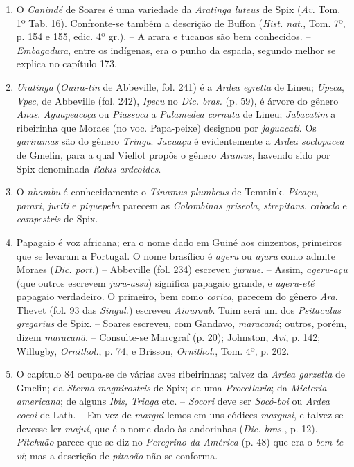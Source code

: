 \begin{enumerate}
\item O \textit{Canindé} de Soares é uma variedade da \textit{Aratinga luteus} de Spix (\textit{Av.} Tom. 1º 
Tab. 16). Confronte-se também a descrição de Buffon (\textit{Hist. nat.}, Tom. 7º, p. 154 e 155, edic. 4º gr.). 
-- A arara e tucanos são bem conhecidos. -- \textit{Embagadura}, entre os 
indígenas, era o punho da espada, segundo melhor se explica no capítulo 173.

\item \textit{Uratinga} (\textit{Ouira-tin} de Abbeville, fol. 241) é a \textit{Ardea egretta} de Lineu; 
\textit{Upeca}, \textit{Vpec}, de Abbeville (fol. 242), \textit{Ipecu} no \textit{Dic. bras.} (p. 59), é árvore do gênero \textit{Anas}.
\textit{Aguapeacoça} ou \textit{Piassoca} a \textit{Palamedea cornuta} de Lineu; 
\textit{Jabacatim} a ribeirinha que Moraes (no voc. Papa-peixe) designou por \textit{jaguacati}. Os 
\textit{gariramas} são do gênero \textit{Tringa}. \textit{Jacuaçu} é evidentemente a \textit{Ardea soclopacea} de Gmelin, 
para a qual Viellot propôs o gênero \textit{Aramus}, havendo sido por Spix denominada \textit{Ralus ardeoides}.

\item O \textit{nhambu} é conhecidamente o \textit{Tinamus plumbeus} de Temnink. \textit{Picaçu}, \textit{parari}, 
\textit{juriti} e \textit{piquepeba} parecem as \textit{Colombinas griseola},
\textit{strepitans}, \textit{caboclo} e \textit{campestris} de Spix.

\item Papagaio é voz africana; era o nome dado em Guiné aos cinzentos, primeiros que 
se levaram a Portugal. O nome brasílico é \textit{ageru} ou \textit{ajuru} como admite Moraes (\textit{Dic. 
port.}) -- Abbeville (fol. 234) escreveu \textit{juruue}. -- Assim, \textit{ageru-açu} 
(que outros escrevem \textit{juru-assu}) significa papagaio
grande, e \textit{ageru-eté} papagaio verdadeiro. O primeiro, bem como \textit{corica},
parecem do gênero \textit{Ara}. Thevet (fol. 93 das \textit{Singul.}) escreveu \textit{Aiouroub}.
Tuim será um dos \textit{Psitaculus gregarius} de Spix. -- Soares escreveu, com
Gandavo, \textit{maracaná}; outros, porém, dizem \textit{maracanã}. -- Consulte-se Marcgraf
(p. 20); Johnston, \textit{Avi}, p. 142; Willugby, \textit{Ornithol.}, p. 74, e Brisson, 
\textit{Ornithol.}, Tom. 4º, p. 202.

\item  O capítulo 84 ocupa-se de várias aves ribeirinhas; talvez da \textit{Ardea garzetta}
de Gmelin; da \textit{Sterna magnirostris} de Spix; de uma \textit{Procellaria};
da \textit{Micteria americana}; de alguns \textit{Ibis, Triaga} etc. -- \textit{Socori} deve ser \textit{Socó-boi} 
ou \textit{Ardea cocoi} de Lath. -- Em vez de \textit{margui} lemos em uns códices \textit{margusi}, 
e talvez se devesse ler \textit{majuí}, que é o nome dado às andorinhas
(\textit{Dic. bras.}, p. 12). -- \textit{Pitchuão} parece que se diz no \textit{Peregrino da América} (p.
48) que era o \textit{bem-te-vi}; mas a descrição de \textit{pitaoão} não se conforma.


\end{enumerate}
